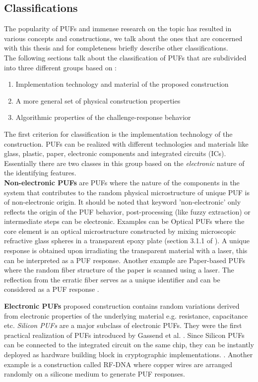 \subsection{Classifications}
The popularity of PUFs and immense research on the topic has resulted in various concepts and constructions, we talk about the ones that are concerned with this thesis and for completeness briefly describe other classifications.\\
The following sections talk about the classification of PUFs that are subdivided into three different groups based on \cite{17}:
\begin{enumerate}
	\item Implementation technology and material of the proposed construction
	\item A more general set of physical construction properties
	\item Algorithmic properties of the challenge-response behavior
\end{enumerate}

The first criterion for classification is the implementation technology of the construction. PUFs can be realized with different technologies and materials like glass, plastic, paper, electronic components and integrated circuits (ICs). Essentially there are two classes in this group based on the \emph{electronic} nature of the identifying features.\\

\textbf{Non-electronic PUFs} are PUFs where the nature of the components in the system that contributes to the random physical microstructure of unique PUF is of non-electronic origin. It should be noted that keyword 'non-electronic' only reflects the origin of the PUF behavior, post-processing (like fuzzy extraction) or intermediate steps can be electronic. Examples can be Optical PUFs where the core element is an optical microstructure constructed by mixing
microscopic refractive glass spheres in a transparent epoxy plate (section 3.1.1 of \cite{thbook}). A unique response is obtained upon irradiating the transparent material with a laser, this can be interpreted as a PUF response. Another example are Paper-based PUFs where the random fiber structure of the paper is scanned using a laser. The reflection from the erratic fiber serves as a unique identifier and can be considered as a PUF response \cite{thbook}.

\textbf{Electronic PUFs} proposed construction contains random variations derived from electronic properties of the underlying material e.g. resistance, capacitance etc. \emph{Silicon PUFs} are a major subclass of electronic PUFs. They were the first practical realization of PUFs introduced by Gassend et al. \cite{21}. Since Silicon PUFs can be connected to the integrated circuit on the same chip, they can be instantly deployed as hardware building block in cryptographic implementations. \cite{17}.
Another example is a construction called RF-DNA where copper wires are arranged randomly on a silicone medium to generate PUF responses.\\

